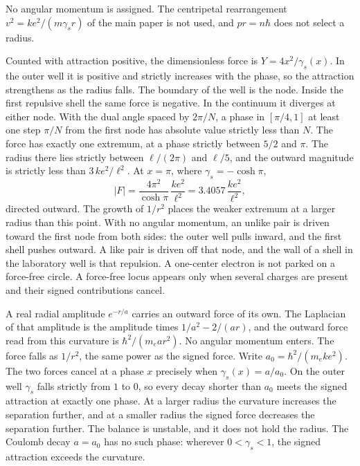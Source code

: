 \documentclass[a4paper]{article}
\begin{document}
No angular momentum is assigned. The centripetal rearrangement \(v^{2}=k e^{2}/(m\gamma_s r)\) of the main paper is not used, and \(pr=n\hbar\) does not select a radius.

Counted with attraction positive, the dimensionless force is \(Y=4x^{2}/\gamma_s(x)\). In the outer well it is positive and strictly increases with the phase, so the attraction strengthens as the radius falls. The boundary of the well is the node. Inside the first repulsive shell the same force is negative. In the continuum it diverges at either node. With the dual angle spaced by \(2\pi/N\), a phase in \([\pi/4,1]\) at least one step \(\pi/N\) from the first node has absolute value strictly less than \(N\). The force has exactly one extremum, at a phase strictly between \(5/2\) and \(\pi\). The radius there lies strictly between \(\ell/(2\pi)\) and \(\ell/5\), and the outward magnitude is strictly less than \(3\,k e^{2}/\ell^{2}\). At \(x=\pi\), where \(\gamma_s=-\cosh\pi\),
\begin{equation}
\label{eq:plateau}
\bigl|F\bigr|
  =\frac{4\pi^{2}}{\cosh\pi}\,\frac{k e^{2}}{\ell^{2}}
  =3.4057\,\frac{k e^{2}}{\ell^{2}},
\end{equation}
directed outward. The growth of \(1/r^{2}\) places the weaker extremum at a larger radius than this point. With no angular momentum, an unlike pair is driven toward the first node from both sides: the outer well pulls inward, and the first shell pushes outward. A like pair is driven off that node, and the wall of a shell in the laboratory well is that repulsion. A one-center electron is not parked on a force-free circle. A force-free locus appears only when several charges are present and their signed contributions cancel.

A real radial amplitude \(e^{-r/a}\) carries an outward force of its own. The Laplacian of that amplitude is the amplitude times \(1/a^{2}-2/(ar)\), and the outward force read from this curvature is \(\hbar^{2}/(m_e a r^{2})\). No angular momentum enters. The force falls as \(1/r^{2}\), the same power as the signed force. Write \(a_0=\hbar^{2}/(m_e k e^{2})\). The two forces cancel at a phase \(x\) precisely when \(\gamma_s(x)=a/a_0\). On the outer well \(\gamma_s\) falls strictly from \(1\) to \(0\), so every decay shorter than \(a_0\) meets the signed attraction at exactly one phase. At a larger radius the curvature increases the separation further, and at a smaller radius the signed force decreases the separation further. The balance is unstable, and it does not hold the radius. The Coulomb decay \(a=a_0\) has no such phase: wherever \(0<\gamma_s<1\), the signed attraction exceeds the curvature.
\end{document}
